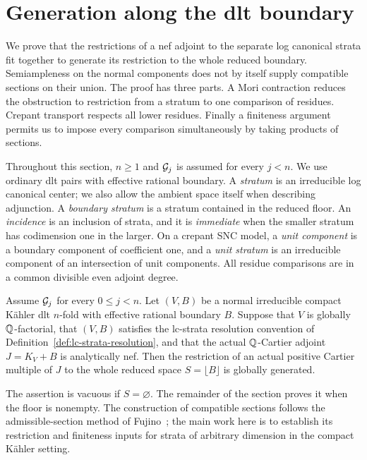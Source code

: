 \section{Generation along the dlt boundary}\label{sec:boundary}

We prove that the restrictions of a nef adjoint to the separate log
canonical strata fit together to generate its restriction to the whole
reduced boundary.  Semiampleness on the normal components does not by itself
supply compatible sections on their union.  The proof has three
parts.  A Mori contraction reduces the obstruction to restriction from a
stratum to one comparison of residues.  Crepant transport respects all
lower residues.  Finally a finiteness argument permits us to impose every
comparison simultaneously by taking products of sections.

Throughout this section, \(n\geq1\) and \(\mathcal G_j\) is assumed for every
\(j<n\).  We use ordinary dlt pairs with effective rational boundary.
A \emph{stratum} is an irreducible log canonical center; we also allow the
ambient space itself when describing adjunction.  A \emph{boundary stratum}
is a stratum contained in the reduced floor.  An \emph{incidence} is an
inclusion of strata, and it is \emph{immediate} when the smaller stratum has
codimension one in the larger.  On a crepant SNC model, a \emph{unit
component} is a boundary component of coefficient one, and a \emph{unit
stratum} is an irreducible component of an intersection of unit components.
All residue comparisons are in a common divisible even adjoint degree.

\begin{theorem}\label{floor:generation}
Assume \(\mathcal G_j\) for every \(0\leq j<n\).
Let \((V,B)\) be a normal irreducible compact K\"ahler dlt \(n\)-fold with
effective rational boundary \(B\).  Suppose that \(V\) is globally
\(\mathbb Q\)-factorial, that \((V,B)\) satisfies the lc-strata resolution
convention of Definition~\ref{def:lc-strata-resolution}, and that the actual
\(\mathbb Q\)-Cartier adjoint \(J=K_V+B\) is analytically nef.
Then the restriction of an actual positive Cartier multiple of \(J\) to
the whole reduced space \(S=\lfloor B\rfloor\) is globally generated.
\end{theorem}

The assertion is vacuous if \(S=\varnothing\).  The remainder of the
section proves it when the floor is nonempty.  The construction of
compatible sections follows the admissible-section method of
Fujino~\cite[Section~4]{Fujino2000}; the main work here is to establish its
restriction and finiteness inputs for strata of arbitrary dimension in the
compact K\"ahler setting.

